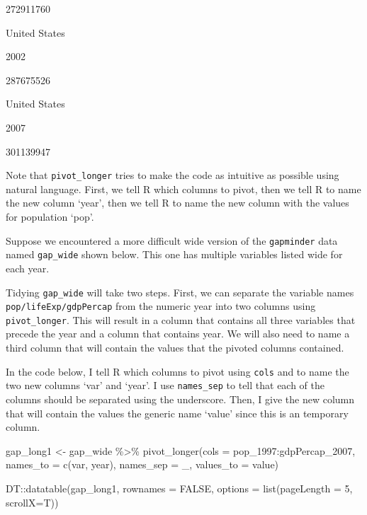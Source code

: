 \documentclass[
]{book}
\makeatletter
\newenvironment{Shaded}{\begin{snugshade}}{\end{snugshade}}
\newcommand{\AttributeTok}[1]{\textcolor[rgb]{0.61,0.61,0.61}{#1}}
\newcommand{\ConstantTok}[1]{\textcolor[rgb]{0,0,0}{#1}}
\newcommand{\DecValTok}[1]{\textcolor[rgb]{0.06,0.06,0.06}{#1}}
\newcommand{\FunctionTok}[1]{\textcolor[rgb]{0,0,0}{#1}}
\newcommand{\NormalTok}[1]{#1}
\newcommand{\OtherTok}[1]{\textcolor[rgb]{0.37,0.37,0.37}{#1}}
\newcommand{\SpecialCharTok}[1]{\textcolor[rgb]{0,0,0}{#1}}
\newcommand{\StringTok}[1]{\textcolor[rgb]{0.5,0.5,0.5}{#1}}
\newenvironment{kframe}{%
\medskip{}
\setlength{\fboxsep}{.8em}
 \def\at@end@of@kframe{}%
 \ifinner\ifhmode%
  \def\at@end@of@kframe{\end{minipage}}%
  \begin{minipage}{\columnwidth}%
 \fi\fi%
 \def\FrameCommand##1{\hskip\@totalleftmargin \hskip-\fboxsep
 \colorbox{shadecolor}{##1}\hskip-\fboxsep
     \hskip-\linewidth \hskip-\@totalleftmargin \hskip\columnwidth}%
 \MakeFramed {\advance\hsize-\width
   \@totalleftmargin\z@ \linewidth\hsize
   \@setminipage}}%
 {\par\unskip\endMakeFramed%
 \at@end@of@kframe}
\renewenvironment{Shaded}{\begin{kframe}}{\end{kframe}}
\makeatother
\begin{document}
272911760

United States

2002

287675526

United States

2007

301139947

Note that \texttt{pivot\_longer} tries to make the code as intuitive as possible using natural language. First, we tell R which columns to pivot, then we tell R to name the new column `year', then we tell R to name the new column with the values for population `pop'.

Suppose we encountered a more difficult wide version of the \texttt{gapminder} data named \texttt{gap\_wide} shown below. This one has multiple variables listed wide for each year.

\hypertarget{htmlwidget-e0e6dbdee66cf9d90e1b}{}

Tidying \texttt{gap\_wide} will take two steps. First, we can separate the variable names \texttt{pop/lifeExp/gdpPercap} from the numeric year into two columns using \texttt{pivot\_longer}. This will result in a column that contains all three variables that precede the year and a column that contains year. We will also need to name a third column that will contain the values that the pivoted columns contained.

In the code below, I tell R which columns to pivot using \texttt{cols} and to name the two new columns `var' and `year'. I use \texttt{names\_sep} to tell that each of the columns should be separated using the underscore. Then, I give the new column that will contain the values the generic name `value' since this is an temporary column.

\begin{Shaded}
\begin{Highlighting}[]
\NormalTok{gap\_long1 }\OtherTok{\textless{}{-}}\NormalTok{ gap\_wide }\SpecialCharTok{\%\textgreater{}\%} 
  \FunctionTok{pivot\_longer}\NormalTok{(}\AttributeTok{cols =}\NormalTok{ pop\_1997}\SpecialCharTok{:}\NormalTok{gdpPercap\_2007,}
               \AttributeTok{names\_to =} \FunctionTok{c}\NormalTok{(}\StringTok{\textquotesingle{}var\textquotesingle{}}\NormalTok{, }\StringTok{\textquotesingle{}year\textquotesingle{}}\NormalTok{),}
               \AttributeTok{names\_sep =} \StringTok{\textquotesingle{}\_\textquotesingle{}}\NormalTok{,}
               \AttributeTok{values\_to =} \StringTok{\textquotesingle{}value\textquotesingle{}}\NormalTok{)}

\NormalTok{DT}\SpecialCharTok{::}\FunctionTok{datatable}\NormalTok{(gap\_long1, }\AttributeTok{rownames =} \ConstantTok{FALSE}\NormalTok{, }\AttributeTok{options =} \FunctionTok{list}\NormalTok{(}\AttributeTok{pageLength =} \DecValTok{5}\NormalTok{, }\AttributeTok{scrollX=}\NormalTok{T))}
\end{Highlighting}
\end{Shaded}
\end{document}

